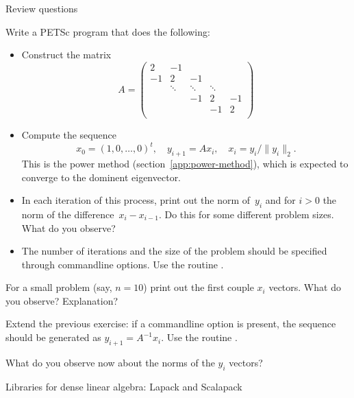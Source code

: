 \begin{istc}
 {Review questions}

\begin{exercise}
Write a PETSc program that does the following:
\begin{itemize}
\item Construct the matrix
  \[
  A=
  \begin{pmatrix}
    2&-1\\ -1&2&-1\\ &\ddots&\ddots&\ddots\\ &&-1&2&-1\\ &&&-1&2\\
  \end{pmatrix}
  \]
\item Compute the sequence
  \[ 
  x_0=(1,0,\ldots,0)^t,\quad y_{i+1}=Ax_i,\quad x_i=y_i/\|y_i\|_2.
  \]
  This is the power method (section~\ref{app:power-method}), which is
  expected to converge to the dominent eigenvector.
\item In each iteration of this process, print out the norm of~$y_i$
  and for $i>0$ the norm of the difference~$x_i-x_{i-1}$. Do this for
  some different problem sizes. What do you observe?
\item The number of iterations and the size of the problem should be
  specified through commandline options. Use the routine
  .
\end{itemize}
For a small problem (say, $n=10$) print out the first couple $x_i$
vectors. What do you observe? Explanation?
\end{exercise}

\end{istc}
\begin{istc}

\begin{exercise}
  Extend the previous exercise: if a commandline option 
  is present, the sequence should be generated as
  $y_{i+1}=A^{-1}x_i$. Use the routine .

  What do you observe now about the norms of the $y_i$ vectors?
\end{exercise}


\end{istc}


 {Libraries for dense linear algebra: Lapack and Scalapack}



